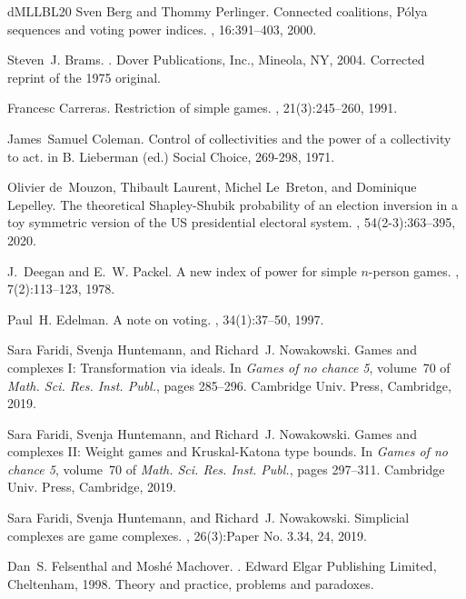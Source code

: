 \documentclass[11pt]{amsart}
\theoremstyle{plain}
\theoremstyle{definition}
\theoremstyle{remark}
\begin{document}
\begin{thebibliography}{dMLLBL20}
Sven Berg and Thommy Perlinger.
\newblock Connected coalitions, {P}ólya sequences and voting power indices.
, 16:391--403, 2000.

Steven~J. Brams.
.
\newblock Dover Publications, Inc., Mineola, NY, 2004.
\newblock Corrected reprint of the 1975 original.

Francesc Carreras.
\newblock Restriction of simple games.
, 21(3):245--260, 1991.

James~Samuel Coleman.
\newblock Control of collectivities and the power of a collectivity to act.
\newblock in B. Lieberman (ed.) Social Choice, 269-298, 1971.

Olivier de~Mouzon, Thibault Laurent, Michel Le~Breton, and Dominique Lepelley.
\newblock The theoretical {Shapley}-{Shubik} probability of an election
  inversion in a toy symmetric version of the {US} presidential electoral
  system.
, 54(2-3):363--395, 2020.

J.~Deegan and E.~W. Packel.
\newblock A new index of power for simple {$n$}-person games.
, 7(2):113--123, 1978.

Paul~H. Edelman.
\newblock A note on voting.
, 34(1):37--50, 1997.

Sara Faridi, Svenja Huntemann, and Richard~J. Nowakowski.
\newblock Games and complexes {I}: {T}ransformation via ideals.
\newblock In {\em Games of no chance 5}, volume~70 of {\em Math. Sci. Res.
  Inst. Publ.}, pages 285--296. Cambridge Univ. Press, Cambridge, 2019.

Sara Faridi, Svenja Huntemann, and Richard~J. Nowakowski.
\newblock Games and complexes {II}: {W}eight games and {K}ruskal-{K}atona type
  bounds.
\newblock In {\em Games of no chance 5}, volume~70 of {\em Math. Sci. Res.
  Inst. Publ.}, pages 297--311. Cambridge Univ. Press, Cambridge, 2019.

Sara Faridi, Svenja Huntemann, and Richard~J. Nowakowski.
\newblock Simplicial complexes are game complexes.
, 26(3):Paper No. 3.34, 24, 2019.

Dan~S. Felsenthal and Mosh\'{e} Machover.
.
\newblock Edward Elgar Publishing Limited, Cheltenham, 1998.
\newblock Theory and practice, problems and paradoxes.


\end{thebibliography}
\end{document}
